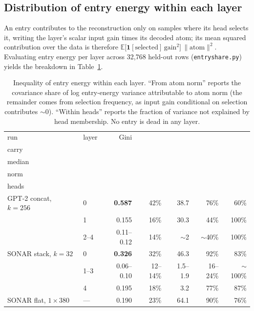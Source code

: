\subsection{Distribution of entry energy within each layer}
\label{sec:entries}

An entry contributes to the reconstruction only on samples where its head
selects it, writing the layer's scalar input gain times its decoded atom;
its mean squared contribution over the data is therefore
$\mathbb{E}\big[\mathbf{1}[\text{selected}]\,\mathrm{gain}^2\big]\,
\lVert\text{atom}\rVert^2$. Evaluating entry energy per layer across
32{,}768 held-out rows (\texttt{entryshare.py}) yields the breakdown in
Table~\ref{tab:entries}.

\begin{table}[htbp]\centering\small
\begin{tabular}{@{}llrrrrr@{}}
\toprule
run & layer & Gini & \stackhead[r]{top 10\%\\carry} & \stackhead[r]{max/\\median}
& \stackhead[r]{from atom\\norm} & \stackhead[r]{within\\heads} \\
\midrule
GPT-2 concat, $k{=}256$ & 0 & \textbf{0.587} & 42\% & 38.7 & 76\% & 60\% \\
& 1 & 0.155 & 16\% & 30.3 & 44\% & 100\% \\
& 2--4 & 0.11--0.12 & 14\% & $\sim$2 & $\sim$40\% & 100\% \\
SONAR stack, $k{=}32$ & 0 & \textbf{0.326} & 32\% & 46.3 & 92\% & 83\% \\
& 1--3 & 0.06--0.10 & 12--14\% & 1.5--1.9 & 16--24\% & $\sim$100\% \\
& 4 & 0.195 & 18\% & 3.2 & 77\% & 87\% \\
SONAR flat, $1\times380$ & --- & 0.190 & 23\% & 64.1 & 90\% & 76\% \\
\bottomrule
\end{tabular}
\caption{Inequality of entry energy within each layer. ``From atom norm''
reports the covariance share of log entry-energy variance attributable to
atom norm (the remainder comes from selection frequency, as input gain
conditional on selection contributes ${\sim}0$). ``Within heads'' reports
the fraction of variance not explained by head membership. No entry is
dead in any layer.}
\label{tab:entries}
\end{table}

